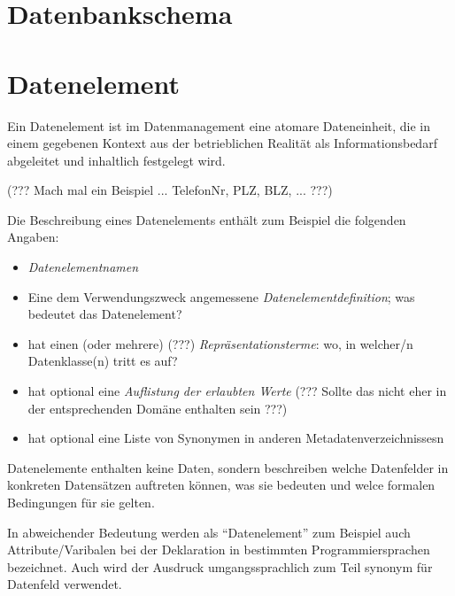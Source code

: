 \documentclass{scrbook}
\begin{document}
\section{Datenbankschema}
	






\section{Datenelement}

Ein Datenelement ist im Datenmanagement eine atomare Dateneinheit,
die in einem gegebenen Kontext aus der betrieblichen Realität 
als Informationsbedarf abgeleitet und inhaltlich festgelegt wird.

(??? Mach mal ein Beispiel ... TelefonNr, PLZ, BLZ, ... ???)

Die Beschreibung eines Datenelements enthält zum Beispiel die folgenden Angaben:
\begin{itemize}
\item \emph{Datenelementnamen}
\item Eine dem Verwendungszweck angemessene \emph{Datenelementdefinition};
		was bedeutet das Datenelement?
\item hat einen (oder mehrere) (???) \emph{Repräsentationsterme}:
		wo, in welcher/n Datenklasse(n) tritt es auf?
\item hat optional eine \emph{Auflistung der erlaubten Werte} 
		(??? Sollte das nicht eher in der entsprechenden Domäne enthalten sein ???) 
\item hat optional eine Liste von Synonymen in anderen Metadatenverzeichnissesn
\end{itemize}

Datenelemente enthalten keine Daten, sondern beschreiben welche Datenfelder
in konkreten Datensätzen auftreten können, was sie bedeuten und welce formalen Bedingungen für sie gelten.

In abweichender Bedeutung werden als \enquote{Datenelement} zum Beispiel auch Attribute/Varibalen
bei der Deklaration in bestimmten Programmiersprachen bezeichnet.
Auch wird der Ausdruck umgangssprachlich zum Teil synonym für Datenfeld verwendet.
\end{document}
